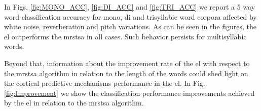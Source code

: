 \documentclass[10pt,letterpaper]{article}
\begin{document}

In Figs. \ref{fig:MONO_ACC}, \ref{fig:DI_ACC} and \ref{fig:TRI_ACC}
we report a 5 way word classification accuracy for mono, di and trisyllabic word corpora affected by
white noise, reverberation and pitch variations.
As can be seen in the figures, the \gls{el} outperforms the \gls{mrstsa} in all cases.
Such behavior persists for multisyllabic words.

\iffalse
Beyond that, information about the improvement rate of the \gls{el} with respect to the \gls{mrstsa} algorithm in relation to the
length of the words could shed light on the
cortical predictive mechanisms performance in the \gls{el}.
In Fig. \ref{fig:Improvement} we show the classification performance improvements achieved by the \gls{el} in relation to the \gls{mrstsa} algorithm.
\end{document}
